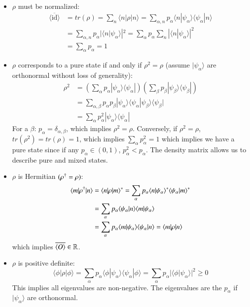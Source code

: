 \documentclass[12pt, a4paper, oneside, openright, titlepage]{book}
\begin{document}
\begin{itemize}
    \item $\rho$ must be normalized: \begin{align*}
            \overline{\langle \text{id}\rangle} &= tr(\rho) = \sum_n\langle n|\rho|n\rangle = \sum_{\alpha,n}p_{\alpha}\langle n|\psi_{\alpha}\rangle\langle \psi_{\alpha}|n\rangle \\
            &= \sum_{\alpha,n}p_{\alpha}|\langle n|\psi_{\alpha}\rangle|^2 = \sum_{\alpha}p_{\alpha}\sum_n|\langle n|\psi_{\alpha}\rangle|^2 \\
            &= \sum_{\alpha}p_{\alpha} = 1
        \end{align*}
    \item $\rho$ corresponds to a pure state if and only if $\rho^2 = \rho$ (assume $|\psi_{\alpha}\rangle$ are orthonormal without loss of generality): \begin{align*}
            \rho^2 &= \left(\sum_{\alpha}p_{\alpha}|\psi_{\alpha}\rangle \langle \psi_{\alpha}|\right)\left(\sum_{\beta}p_{\beta}|\psi_{\beta}\rangle\langle \psi_{\beta}|\right) \\
            &= \sum_{\alpha,\beta}p_{\alpha}p_{\beta}|\psi_{\alpha}\rangle\langle \psi_{\alpha}|\psi_{\beta}\rangle\langle\psi_{\beta}| \\
            &= \sum_{\alpha}p_{\alpha}^2|\psi_{\alpha}\rangle\langle \psi_{\alpha}|
    \end{align*}
        For a  $\beta$: $p_{\alpha} = \delta_{\alpha,\beta}$, which implies $\rho^2 = \rho$. Conversely, if $\rho^2 = \rho$, $tr(\rho^2) = tr(\rho) = 1$, which implies $\sum_{\alpha}p_{\alpha}^2 = 1$ which implies we have a pure state since if any $p_{\alpha} \in (0,1)$, $p_{\alpha}^2 < p_{\alpha}$. The density matrix allows us to describe pure and mixed states.
    \item $\rho$ is Hermitian $(\rho^{\text{\textdagger}} = \rho)$: \begin{align*}
            \langle m|\rho^{\text{\textdagger}}|n\rangle &= \langle n | \rho |m\rangle^* = \sum_{\alpha}p_{\alpha}\langle n | \psi_{\alpha}\rangle^*\langle \psi_{\alpha}|m\rangle^* \\
            &= \sum_{\alpha}p_{\alpha}\langle \psi_{\alpha}|n\rangle\langle m|\psi_{\alpha}\rangle \\
            &= \sum_{\alpha}p_{\alpha}\langle m|\psi_{\alpha}\rangle \langle \psi_{\alpha}|n\rangle = \langle m|\rho|n\rangle
    \end{align*}
        which implies $\overline{\langle O\rangle} \in \mathbb R$.
    \item $\rho$ is positive definite: \begin{equation*}
            \langle \phi|\rho|\phi\rangle = \sum_{\alpha}p_{\alpha}\langle \phi|\psi_{\alpha}\rangle\langle \psi_{\alpha}|\phi\rangle = \sum_{\alpha}p_{\alpha}|\langle \phi|\psi_{\alpha}\rangle|^2\geq 0
    \end{equation*}
        This implies all eigenvalues are non-negative. The eigenvalues are the $p_{\alpha}$ if $|\psi_{\alpha}\rangle$ are orthonormal.
\end{itemize}
\end{document}
